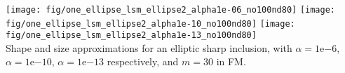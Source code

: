 \documentclass[10pt,xcolor={dvipsnames}]{beamer}
\newcommand*{\xMin}{0}%
\newcommand*{\xMax}{6}%
\newcommand*{\yMin}{0}%
\newcommand*{\yMax}{6}%
\theoremstyle{plain}
\theoremstyle{plain}
\renewcommand{\i}{\textup{i}}
\begin{document}
%           
%         
%       
% 
%      
% 
% 
\begin{frame}
 \frametitle{}
{
\texttt{[image: fig/one\_ellipse\_lsm\_ellipse2\_alpha1e-06\_no100nd80]}
}
{
\texttt{[image: fig/one\_ellipse\_lsm\_ellipse2\_alpha1e-10\_no100nd80]}
}
{
\texttt{[image: fig/one\_ellipse\_lsm\_ellipse2\_alpha1e-13\_no100nd80]}
}
\\
Shape and size approximations for an elliptic sharp inclusion, with $\alpha=\mathrm{1e}{-6}$, 
$\alpha=\mathrm{1e}{-10}$, $\alpha=\mathrm{1e}{-13}$ respectively, and $m=30$ in FM.

\end{frame}
\end{document}
